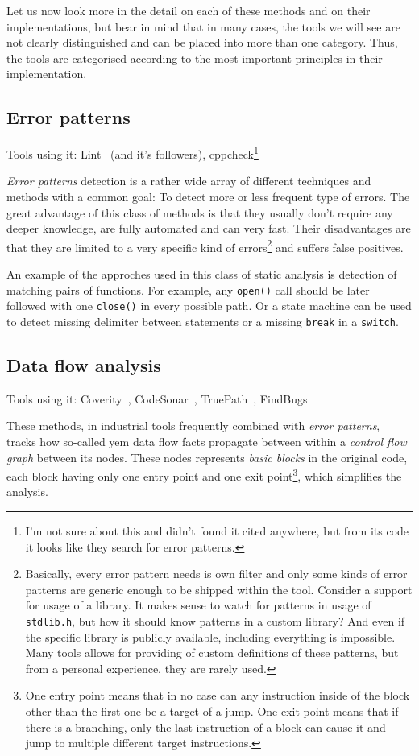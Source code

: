 Let us now look more in the detail on each of these methods and on their implementations, but bear in mind that in many cases, the tools we will see are not clearly distinguished and can be placed into more than one category. Thus, the tools are categorised according to the most important principles in their implementation.

\subsection{Error patterns}
Tools using it: Lint~\cite{KrenaVojnarOverview} (and it's followers), cppcheck\footnote{I'm not sure about this and didn't found it cited anywhere, but from its code it looks like they search for error patterns.}

{\em Error patterns} detection is a rather wide array of different techniques and methods with a common goal: To detect more or less frequent type of errors. The great advantage of this class of methods is that they usually don't require any deeper knowledge, are fully automated and can very fast. Their disadvantages are that they are limited to a very specific kind of errors\footnote{Basically, every error pattern needs is own filter and only some kinds of error patterns are generic enough to be shipped within the tool. Consider a support for usage of a library. It makes sense to watch for patterns in usage of {\tt stdlib.h}, but how it should know patterns in a custom library? And even if the specific library is publicly available, including everything is impossible. Many tools allows for providing of custom definitions of these patterns, but from a personal experience, they are rarely used.} and suffers false positives.

An example of the approches used in this class of static analysis is detection of matching pairs of functions. For example, any {\tt open()} call should be later followed with one {\tt close()} in every possible path. Or a state machine can be used to detect missing delimiter between statements or a missing {\tt break} in a {\tt switch}.
\subsection{Data flow analysis}
Tools using it: Coverity~\cite{KrenaVojnarOverview}, CodeSonar~\cite{KrenaVojnarOverview}, TruePath~\cite{KrenaVojnarOverview}, FindBugs~\cite{KrenaVojnarOverview}

These methods, in industrial tools frequently combined with {\em error patterns}, tracks how so-called {yem data flow facts} propagate between within a {\em control flow graph} between its nodes. These nodes represents {\em basic blocks} in the original code, each block having only one entry point and one exit point\footnote{One entry point means that in no case can any instruction inside of the block other than the first one be a target of a jump. One exit point means that if there is a branching, only the last instruction of a block can cause it and jump to multiple different target instructions.}, which simplifies the analysis.

